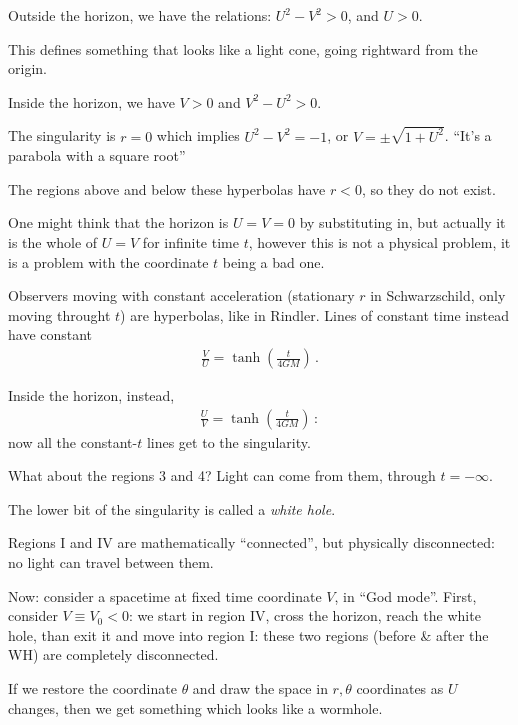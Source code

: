 \documentclass[main.tex]{subfiles}
\begin{document}
Outside the horizon, we have the relations: \(U^2-V^2>0\), and \(U>0\). 

This defines something that looks like a light cone, going rightward from the origin. 

Inside the horizon, we have \(V>0\) and \(V^2-U^2>0\). 

The singularity is \(r=0\) which implies \(U^2- V^2 = -1\), or \(V = \pm \sqrt{1 + U^2}\). 
``It's a parabola with a square root'' 

The regions above and below these hyperbolas have \(r<0\), so they do not exist. 

One might think that the horizon is \(U = V = 0\) by substituting in, but actually it is the whole of \(U = V\) for infinite time \(t\), however this is not a physical problem, it is a problem with the coordinate \(t\) being a bad one. 

Observers moving with constant acceleration (stationary \(r\) in Schwarzschild, only moving throught \(t\)) are hyperbolas, like in Rindler. Lines of constant time instead have constant 
%
\begin{align}
  \frac{V}{U} = \tanh(\frac{t}{4GM})
\,.
\end{align}

Inside the horizon, instead, 
 \begin{align}
   \frac{U}{V} = \tanh(\frac{t}{4GM})
 \,:
 \end{align}
now all the constant-\(t\) lines get to the singularity. 

What about the regions 3 and 4? Light can come from them, through \(t = - \infty\). 

The lower bit of the singularity is called a \emph{white hole}. 

Regions I and IV are mathematically ``connected'', but physically disconnected: no light can travel between them. 

Now: consider a spacetime at fixed time coordinate \(V\), in ``God mode''. 
First, consider \(V \equiv V_0 < 0\): we start in region IV, cross the horizon, reach the white hole, than exit it and move into region I: these two regions (before \& after the WH) are completely disconnected.   


If we restore the coordinate \(\theta \) and draw the space in \(r, \theta \) coordinates as \(U\) changes, then we get something which looks like a wormhole. 
\end{document}
